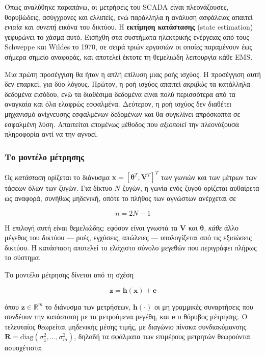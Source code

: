Όπως αναλύθηκε παραπάνω, οι μετρήσεις του SCADA είναι πλεονάζουσες, θορυβώδεις, ασύγχρονες
και ελλιπείς, ενώ παράλληλα η ανάλυση ασφάλειας απαιτεί \emph{ενιαία και συνεπή} εικόνα του
δικτύου. Η \textbf{εκτίμηση κατάστασης} (state estimation) γεφυρώνει το χάσμα αυτό.
Εισήχθη στα συστήματα ηλεκτρικής ενέργειας από τους Schweppe και Wildes το 1970, σε σειρά
τριών εργασιών οι οποίες παραμένουν έως σήμερα σημείο αναφοράς, και αποτελεί έκτοτε τη
θεμελιώδη λειτουργία κάθε EMS.

Μια πρώτη προσέγγιση θα ήταν η απλή επίλυση μιας ροής ισχύος. Η προσέγγιση αυτή δεν
επαρκεί, για δύο λόγους. Πρώτον, η ροή ισχύος απαιτεί \emph{ακριβώς} τα κατάλληλα δεδομένα
εισόδου, ενώ τα διαθέσιμα δεδομένα είναι πολύ περισσότερα από τα αναγκαία και όλα ελαφρώς
εσφαλμένα. Δεύτερον, η ροή ισχύος δεν διαθέτει μηχανισμό ανίχνευσης εσφαλμένων δεδομένων
και θα συγκλίνει απρόσκοπτα σε εσφαλμένη λύση. Απαιτείται επομένως μέθοδος που
\emph{αξιοποιεί} την πλεονάζουσα πληροφορία αντί να την αγνοεί.

\subsubsection*{Το μοντέλο μέτρησης}

Ως \emph{κατάσταση} ορίζεται το διάνυσμα
$\mathbf{x} = [\boldsymbol{\theta}^{T}, \mathbf{V}^{T}]^{T}$ των γωνιών και των μέτρων των
τάσεων όλων των ζυγών. Για δίκτυο $N$ ζυγών, η γωνία ενός ζυγού ορίζεται αυθαίρετα ως
αναφορά, συνήθως μηδενική, οπότε το πλήθος των αγνώστων ανέρχεται σε

\begin{equation}
n = 2N - 1
\label{eq:nstates}
\end{equation}

Η επιλογή αυτή είναι θεμελιώδης: εφόσον είναι γνωστά τα $\mathbf{V}$ και
$\boldsymbol{\theta}$, \emph{κάθε} άλλο μέγεθος του δικτύου — ροές, εγχύσεις, απώλειες —
υπολογίζεται από τις εξισώσεις δικτύου. Η κατάσταση αποτελεί το ελάχιστο σύνολο μεγεθών που
περιγράφει πλήρως το σύστημα.

Το μοντέλο μέτρησης δίνεται από τη σχέση

\begin{equation}
\mathbf{z} = \mathbf{h}(\mathbf{x}) + \mathbf{e}
\label{eq:measmodel}
\end{equation}

όπου $\mathbf{z} \in \mathbb{R}^{m}$ το διάνυσμα των μετρήσεων, $\mathbf{h}(\cdot)$ οι μη
γραμμικές συναρτήσεις που συνδέουν την κατάσταση με τα μετρούμενα μεγέθη, και $\mathbf{e}$
ο θόρυβος μέτρησης. Ο τελευταίος θεωρείται μηδενικής μέσης τιμής, με διαγώνιο πίνακα
συνδιακύμανσης $\mathbf{R} = \mathrm{diag}(\sigma_1^2, \ldots, \sigma_m^2)$, δηλαδή τα
σφάλματα των επιμέρους μετρητών θεωρούνται ασυσχέτιστα.

